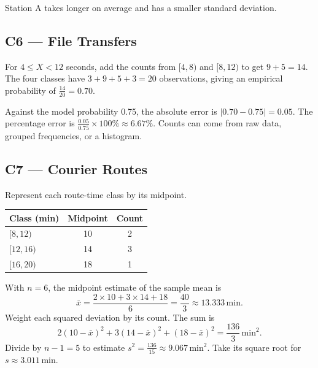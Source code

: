 Station A takes longer on average and has a smaller standard deviation.

\subsection*{C6 --- File Transfers}

For \(4\le X<12\) seconds, add the counts from \([4,8)\) and \([8,12)\) to get \(9+5=14\). The four classes have \(3+9+5+3=20\) observations, giving an empirical probability of \(\frac{14}{20}=\mathbf{0.70}\).

Against the model probability 0.75, the absolute error is \(\lvert0.70-0.75\rvert=\mathbf{0.05}\). The percentage error is \(\frac{0.05}{0.75}\times100\%\approx\mathbf{6.67\%}\). Counts can come from raw data, grouped frequencies, or a histogram.

\subsection*{C7 --- Courier Routes}

\begin{center}
  {\small Represent each route-time class by its midpoint.\par}\smallskip
  \begin{tabular}{@{}lcc@{}}
    \toprule
    \textbf{Class (min)} & \textbf{Midpoint} & \textbf{Count}\\
    \midrule
    \([8,12)\) & 10 & 2\\
    \([12,16)\) & 14 & 3\\
    \([16,20)\) & 18 & 1\\
    \bottomrule
  \end{tabular}
\end{center}

With \(n=6\), the midpoint estimate of the sample mean is
\[
  \bar{x}=\frac{2\times10+3\times14+18}{6}=\frac{40}{3}\approx\mathbf{13.333}\,\mathrm{min}.
\]
Weight each squared deviation by its count. The sum is
\[
  2(10-\bar{x})^2+3(14-\bar{x})^2+(18-\bar{x})^2=\frac{136}{3}\,\mathrm{min}^2.
\]
Divide by \(n-1=5\) to estimate \(s^2=\frac{136}{15}\approx\mathbf{9.067}\,\mathrm{min}^2\). Take its square root for \(s\approx\mathbf{3.011}\,\mathrm{min}\).

